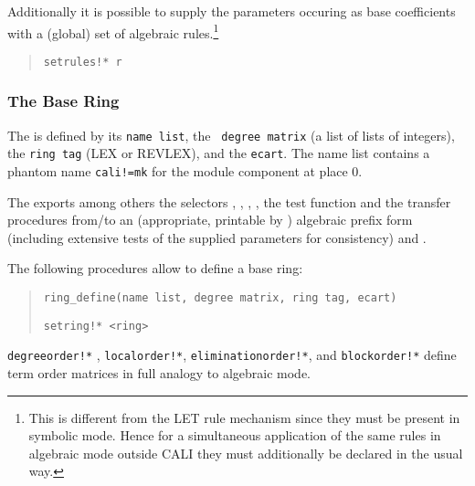 Additionally it is possible to supply the
parameters occuring as base coefficients with a (global) set of
algebraic rules.\footnote{This is different from the LET rule
mechanism since they must be present in symbolic mode. Hence for a
simultaneous application of the same rules in algebraic mode outside
CALI they must additionally be declared in the usual way.}
\begin{quote}
\verb|setrules!* r|

\end{quote}

\subsubsection{The Base Ring}

The  is defined by its \texttt{name list}, the {\tt
degree matrix} (a list of lists of integers), the \texttt{ring tag} (LEX
or REVLEX), and the \texttt{ecart}. The name list contains a phantom
name \texttt{cali!=mk} for the module component at place 0.
\medskip

The  exports among others the selectors
, , ,
, the test function  and the
transfer procedures from/to an (appropriate, printable by
) algebraic prefix form  (including
extensive tests of the supplied parameters for consistency) and
. 

The following procedures allow to define a base ring:
\begin{quote}
\verb|ring_define(name list, degree matrix, ring tag, ecart)|


\verb|setring!* <ring> |

\end{quote}
\verb|degreeorder!*| , \verb|localorder!*|, \verb|eliminationorder!*|, and
\verb|blockorder!*|
define term order matrices in full analogy to algebraic mode.
\medskip


